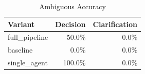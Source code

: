 \begin{table}[htbp]
\centering
\caption{Ambiguous Accuracy}
\label{tab:acc-ambig}
\begin{tabular}{l rr}
\toprule
Variant & Decision & Clarification \\
\midrule
  full\_pipeline & 50.0\% & 0.0\% \\
  baseline & 0.0\% & 0.0\% \\
  single\_agent & 100.0\% & 0.0\% \\
\bottomrule
\end{tabular}
\end{table}
